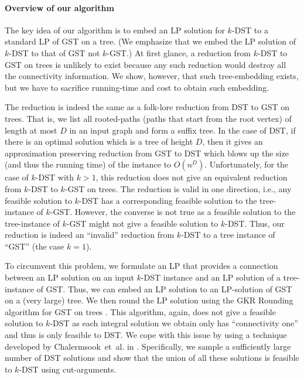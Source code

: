 \documentclass[11pt]{article}
\theoremstyle{definition}
\theoremstyle{remark}
\begin{document}
\paragraph{Overview of our algorithm}

The key idea of our algorithm is to embed an LP solution 
for $k$-DST to a standard LP of GST on a tree.
(We emphasize that we embed the LP solution of $k$-DST to that of GST
not $k$-GST.) 
At first glance, a reduction from $k$-DST to GST on trees
is unlikely to exist because any such reduction 
would destroy all the connectivity information.
We show, however, that such tree-embedding exists,
but we have to sacrifice running-time and cost to obtain such
embedding.

The reduction is indeed the same as a folk-lore reduction from DST
to GST on trees. 
That is, we list all rooted-paths (paths that start from the root
vertex) of length at most $D$ in an input graph and form a suffix
tree. 
In the case of DST, if there is an optimal solution which is a tree of
height $D$, then it gives an approximation preserving reduction from
GST to DST which blows up the size (and thus the running time) of the 
instance to $O(n^D)$.  
Unfortunately, for the case of $k$-DST with $k>1$, 
this reduction does not give an equivalent reduction 
from $k$-DST to $k$-GST on trees. 
The reduction is valid in one direction, i.e., any feasible solution
to $k$-DST has a corresponding feasible solution to the tree-instance
of $k$-GST. 
However, the converse is not true as a feasible solution to the
tree-instance of $k$-GST might not give a feasible solution to $k$-DST.
Thus, our reduction is indeed an ``invalid'' reduction from $k$-DST to
a tree instance of ``GST'' (the case $k=1$).

To circumvent this problem, we formulate an LP that provides a
connection between an LP solution on an input $k$-DST instance 
and an LP solution of a tree-instance of GST. 
Thus, we can embed an LP solution to an LP-solution of GST on a 
(very large) tree.
We then round the LP solution using the GKR Rounding algorithm for GST on
trees \cite{GargKR00}.
This algorithm, again, does not give a feasible solution to $k$-DST as
each integral solution we obtain only has ``connectivity one'' 
and thus is only feasible to DST.
We cope with this issue by using a technique 
developed by Chalermsook~et~al. in \cite{ChalermsookGL15}.
Specifically, we sample a sufficiently large number of
DST solutions and show that the union of all these solutions
is feasible to $k$-DST using cut-arguments.
\end{document}
